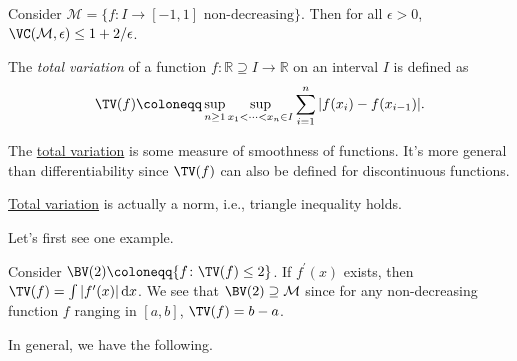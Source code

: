 \begin{eg}
	Consider \(\mathcal{M} = \{ f\colon I \to [-1, 1] \text{ non-decreasing}  \} \). Then for all \(\epsilon > 0\), \(\VC(\mathcal{M} , \epsilon ) \leq 1 + 2 / \epsilon \).
\end{eg}

\begin{definition}\label{def:total-variation}
	The \emph{total variation} of a function \(f \colon \mathbb{R} \supseteq I \to \mathbb{R} \) on an interval \(I\) is defined as
	\[
		\TV(f) \coloneqq \sup _{n \geq 1} \sup _{x_1 < \dots < x_n \in I} \sum_{i=1}^{n} \vert f(x_i) - f(x_{i-1}) \vert.
	\]
\end{definition}

\begin{intuition}
	The \hyperref[def:total-variation]{total variation} is some measure of smoothness of functions. It's more general than differentiability since \(\TV(f) \) can also be defined for discontinuous functions.
\end{intuition}

\begin{remark}
	\hyperref[def:total-variation]{Total variation} is actually a norm, i.e., triangle inequality holds.
\end{remark}

Let's first see one example.

\begin{eg}
	Consider \(\BV(2) \coloneqq \{ f \colon \TV(f) \leq 2 \} \). If \(f^{\prime} (x)\) exists, then \(\TV(f) = \int \vert f^{\prime} (x) \vert \,\mathrm{d} x\). We see that \(\BV(2) \supseteq \mathcal{M} \) since for any non-decreasing function \(f\) ranging in \([a, b]\), \(\TV(f) = b - a\).
\end{eg}

In general, we have the following.

